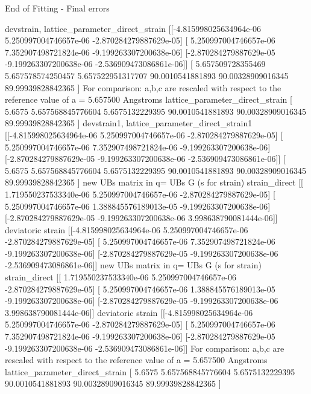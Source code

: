 \documentclass[letterpaper,10pt,english]{sphinxmanual}
\begin{document}
\begin{sphinxalltt}
 \sphinxstylestrong{**********}  End of Fitting  -  Final errors  \sphinxstylestrong{**************}


devstrain, lattice\_parameter\_direct\_strain {[}{[}-4.815998025634964e-06  5.250997004746657e-06 -2.870284279887629e-05{]}
 {[} 5.250997004746657e-06  7.352907498721824e-06 -9.199263307200638e-06{]}
 {[}-2.870284279887629e-05 -9.199263307200638e-06 -2.536909473086861e-06{]}{]} {[} 5.657509728355469  5.657578574250457  5.657522951317707
 90.0010541881893   90.00328909016345  89.99939828842365 {]}
For comparison: a,b,c are rescaled with respect to the reference value of a = 5.657500 Angstroms
lattice\_parameter\_direct\_strain {[} 5.6575             5.657568845776604  5.6575132229395
 90.0010541881893   90.00328909016345  89.99939828842365 {]}
devstrain1, lattice\_parameter\_direct\_strain1 {[}{[}-4.815998025634964e-06  5.250997004746657e-06 -2.870284279887629e-05{]}
 {[} 5.250997004746657e-06  7.352907498721824e-06 -9.199263307200638e-06{]}
 {[}-2.870284279887629e-05 -9.199263307200638e-06 -2.536909473086861e-06{]}{]} {[} 5.6575             5.657568845776604  5.6575132229395
 90.0010541881893   90.00328909016345  89.99939828842365 {]}
new UBs matrix in q= UBs G (s for strain)
strain\_direct {[}{[} 1.719550237533340e-06  5.250997004746657e-06 -2.870284279887629e-05{]}
 {[} 5.250997004746657e-06  1.388845576189013e-05 -9.199263307200638e-06{]}
 {[}-2.870284279887629e-05 -9.199263307200638e-06  3.998638790081444e-06{]}{]}
deviatoric strain {[}{[}-4.815998025634964e-06  5.250997004746657e-06 -2.870284279887629e-05{]}
 {[} 5.250997004746657e-06  7.352907498721824e-06 -9.199263307200638e-06{]}
 {[}-2.870284279887629e-05 -9.199263307200638e-06 -2.536909473086861e-06{]}{]}
new UBs matrix in q= UBs G (s for strain)
strain\_direct {[}{[} 1.719550237533340e-06  5.250997004746657e-06 -2.870284279887629e-05{]}
 {[} 5.250997004746657e-06  1.388845576189013e-05 -9.199263307200638e-06{]}
 {[}-2.870284279887629e-05 -9.199263307200638e-06  3.998638790081444e-06{]}{]}
deviatoric strain {[}{[}-4.815998025634964e-06  5.250997004746657e-06 -2.870284279887629e-05{]}
 {[} 5.250997004746657e-06  7.352907498721824e-06 -9.199263307200638e-06{]}
 {[}-2.870284279887629e-05 -9.199263307200638e-06 -2.536909473086861e-06{]}{]}
For comparison: a,b,c are rescaled with respect to the reference value of a = 5.657500 Angstroms
lattice\_parameter\_direct\_strain {[} 5.6575             5.657568845776604  5.6575132229395
 90.0010541881893   90.00328909016345  89.99939828842365 {]}

\end{sphinxalltt}
\end{document}
